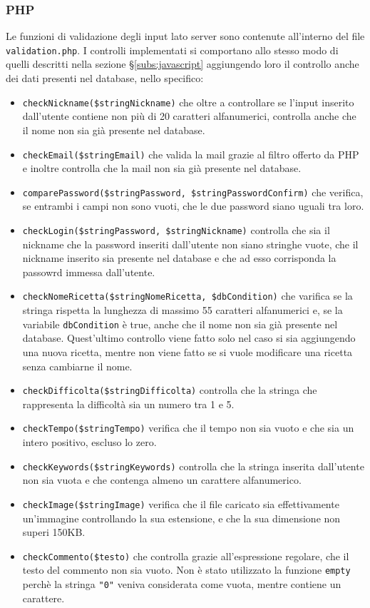\subsubsection{PHP}\label{subs:php}
Le funzioni di validazione degli input lato server sono contenute all'interno del file \texttt{validation.php}. I controlli implementati si comportano allo stesso modo di quelli descritti nella sezione \S\ref{subs:javascript} aggiungendo loro il controllo anche dei dati presenti nel database, nello specifico:
\begin{itemize}
	\item \texttt{checkNickname(\$stringNickname)} che oltre a controllare se l'input inserito dall'utente contiene non più di 20 caratteri alfanumerici, controlla anche che il nome non sia già presente nel database.
	\item \texttt{checkEmail(\$stringEmail)} che valida la mail grazie al filtro offerto da PHP e inoltre controlla che la mail non sia già presente nel database.
	\item \texttt{comparePassword(\$stringPassword, \$stringPasswordConfirm)} che verifica, se entrambi i campi non sono vuoti, che le due password siano uguali tra loro. 
	\item \texttt{checkLogin(\$stringPassword, \$stringNickname)} controlla che sia il nickname che la password inseriti dall'utente non siano stringhe vuote, che il nickname inserito sia presente nel database e che ad esso corrisponda la passowrd immessa dall'utente.
	\item \texttt{checkNomeRicetta(\$stringNomeRicetta, \$dbCondition)} che varifica se la stringa rispetta la lunghezza di massimo 55 caratteri alfanumerici e, se la variabile \texttt{dbCondition} è true, anche che il nome non sia già presente nel database. Quest'ultimo controllo viene fatto solo nel caso si sia aggiungendo una nuova ricetta, mentre non viene fatto se si vuole modificare una ricetta senza cambiarne il nome.
	\item \texttt{checkDifficolta(\$stringDifficolta)} controlla che la stringa che rappresenta la difficoltà sia un numero tra 1 e 5.
	\item \texttt{checkTempo(\$stringTempo)} verifica che il tempo non sia vuoto e che sia un intero positivo, escluso lo zero.
	\item \texttt{checkKeywords(\$stringKeywords)} controlla che la stringa inserita dall'utente non sia vuota e che contenga almeno un carattere alfanumerico.
	\item \texttt{checkImage(\$stringImage)} verifica che il file caricato sia effettivamente un'immagine controllando la sua estensione, e che la sua dimensione non superi 150KB.
	\item \texttt{checkCommento(\$testo)} che controlla grazie all'espressione regolare, che il testo del commento non sia vuoto. Non è stato utilizzato la funzione \texttt{empty} perchè la stringa \texttt{"0"} veniva considerata come vuota, mentre contiene un carattere.
\end{itemize}
